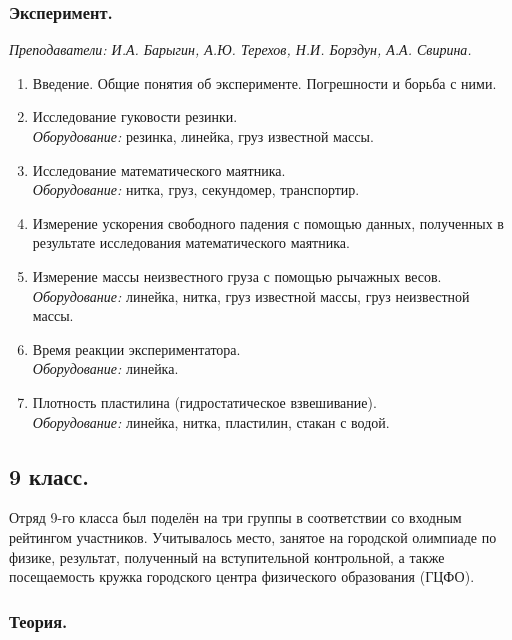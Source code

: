 \documentclass[12pt]{article}
\newlength{\h}
\newlength{\x}
\begin{document}
\clearpage

\restoregeometry
\subsubsection{Эксперимент.}
\label{sec:daily8exp}

\textit{Преподаватели: И.А. Барыгин, А.Ю. Терехов, Н.И. Борздун, А.А. Свирина.}\\

\begin{enumerate}
\item Введение. Общие понятия об эксперименте. Погрешности и борьба с
  ними.
\item Исследование гуковости резинки. \\
  \textit{Оборудование:} резинка, линейка, груз известной массы.
\item Исследование математического маятника. \\
  \textit{Оборудование:} нитка, груз, секундомер, транспортир.
\item Измерение ускорения свободного падения с помощью данных,
  полученных в результате исследования математического маятника.
\item Измерение массы неизвестного груза с помощью рычажных весов. \\
  \textit{Оборудование:} линейка, нитка, груз известной массы,
  груз неизвестной массы. 
\item Время реакции экспериментатора. \\
  \textit{Оборудование:} линейка.
\item Плотность пластилина (гидростатическое взвешивание). \\
  \textit{Оборудование:} линейка, нитка, пластилин, стакан с водой. 
\end{enumerate}


\subsection{9 класс.}
\label{sec:daily9}

Отряд 9-го класса был поделён на три группы в соответствии со входным
рейтингом участников. Учитывалось место, занятое на городской
олимпиаде по физике, результат, полученный на вступительной
контрольной, а также посещаемость кружка городского центра физического
образования (ГЦФО). 

\subsubsection{Теория.}
\label{sec:daily9th}
\end{document}
